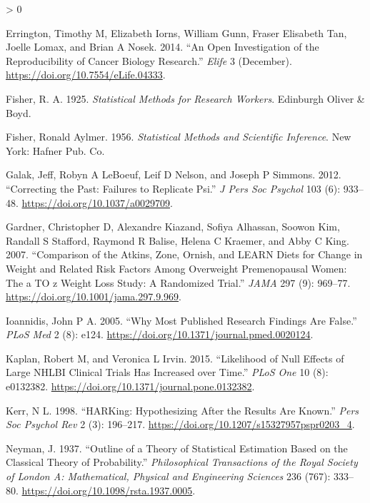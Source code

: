\documentclass[
  12pt,
]{book}
\newlength{\cslhangindent}
\newenvironment{CSLReferences}[2] %
 {%
  \setlength{\parindent}{0pt}
  \ifodd #1 \everypar{\setlength{\hangindent}{\cslhangindent}}\ignorespaces\fi
  \ifnum #2 > 0
  \setlength{\parskip}{#2\baselineskip}
  \fi
 }%
 {}
\theoremstyle{definition}
\theoremstyle{definition}
\theoremstyle{definition}
\theoremstyle{remark}
\begin{document}
\begin{CSLReferences}{1}{0}
\leavevmode\hypertarget{ref-erri:iorn:gunn:2014}{}%
Errington, Timothy M, Elizabeth Iorns, William Gunn, Fraser Elisabeth Tan, Joelle Lomax, and Brian A Nosek. 2014. {``An Open Investigation of the Reproducibility of Cancer Biology Research.''} \emph{Elife} 3 (December). \url{https://doi.org/10.7554/eLife.04333}.

\leavevmode\hypertarget{ref-fisher1925statistical}{}%
Fisher, R. A. 1925. \emph{Statistical Methods for Research Workers}. Edinburgh Oliver \& Boyd.

\leavevmode\hypertarget{ref-fish:1956}{}%
Fisher, Ronald Aylmer. 1956. \emph{Statistical Methods and Scientific Inference}. New York: Hafner Pub. Co.

\leavevmode\hypertarget{ref-gala:lebo:nels:2012}{}%
Galak, Jeff, Robyn A LeBoeuf, Leif D Nelson, and Joseph P Simmons. 2012. {``Correcting the Past: Failures to Replicate Psi.''} \emph{J Pers Soc Psychol} 103 (6): 933--48. \url{https://doi.org/10.1037/a0029709}.

\leavevmode\hypertarget{ref-gard:kiaz:alha:2007}{}%
Gardner, Christopher D, Alexandre Kiazand, Sofiya Alhassan, Soowon Kim, Randall S Stafford, Raymond R Balise, Helena C Kraemer, and Abby C King. 2007. {``Comparison of the Atkins, Zone, Ornish, and LEARN Diets for Change in Weight and Related Risk Factors Among Overweight Premenopausal Women: The a TO z Weight Loss Study: A Randomized Trial.''} \emph{JAMA} 297 (9): 969--77. \url{https://doi.org/10.1001/jama.297.9.969}.

\leavevmode\hypertarget{ref-ioan:2005}{}%
Ioannidis, John P A. 2005. {``Why Most Published Research Findings Are False.''} \emph{PLoS Med} 2 (8): e124. \url{https://doi.org/10.1371/journal.pmed.0020124}.

\leavevmode\hypertarget{ref-kapl:irvi:2015}{}%
Kaplan, Robert M, and Veronica L Irvin. 2015. {``Likelihood of Null Effects of Large NHLBI Clinical Trials Has Increased over Time.''} \emph{PLoS One} 10 (8): e0132382. \url{https://doi.org/10.1371/journal.pone.0132382}.

\leavevmode\hypertarget{ref-kerr:1998}{}%
Kerr, N L. 1998. {``HARKing: Hypothesizing After the Results Are Known.''} \emph{Pers Soc Psychol Rev} 2 (3): 196--217. \url{https://doi.org/10.1207/s15327957pspr0203_4}.

\leavevmode\hypertarget{ref-Neyman37}{}%
Neyman, J. 1937. {``Outline of a Theory of Statistical Estimation Based on the Classical Theory of Probability.''} \emph{Philosophical Transactions of the Royal Society of London A: Mathematical, Physical and Engineering Sciences} 236 (767): 333--80. \url{https://doi.org/10.1098/rsta.1937.0005}.


\end{CSLReferences}
\end{document}
